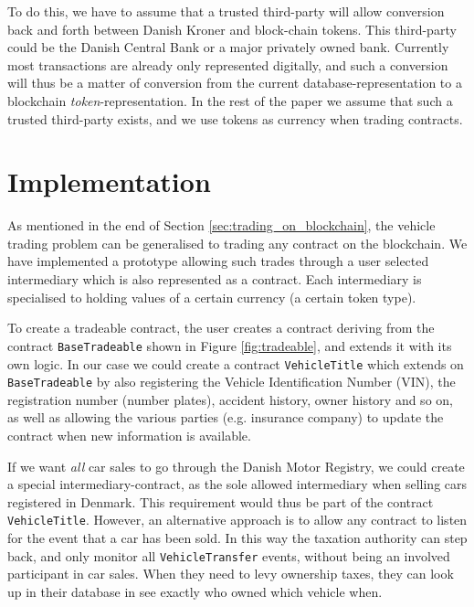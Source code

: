 \documentclass[oneside,a4paper,10pts,article]{memoir}
\begin{document}
To do this, we have to assume that a trusted third-party will allow
conversion back and forth between Danish Kroner and block-chain
tokens. This third-party could be the Danish Central Bank or a major
privately owned bank. Currently most transactions are already only
represented digitally, and such a conversion will thus be a matter of
conversion from the current database-representation to a blockchain
\emph{token}-representation. In the rest of the paper we assume that
such a trusted third-party exists, and we use tokens as currency when
trading contracts.

\chapter{Implementation}
\label{sec:implementation}
As mentioned in the end of Section \ref{sec:trading_on_blockchain},
the vehicle trading problem can be generalised to trading any contract
on the blockchain. We have implemented a prototype allowing such
trades through a user selected intermediary which is also represented
as a contract. Each intermediary is specialised to holding values of a
certain currency (a certain token type).

To create a tradeable contract, the user creates a contract deriving
from the contract \texttt{BaseTradeable} shown in Figure
\ref{fig:tradeable}, and extends it with its own logic. In our case we
could create a contract \texttt{VehicleTitle} which extends on
\texttt{BaseTradeable} by also registering the Vehicle Identification
Number (VIN), the registration number (number plates), accident
history, owner history and so on, as well as allowing the various
parties (e.g. insurance company) to update the contract when new
information is available.

If we want \emph{all} car sales to go through the Danish Motor
Registry, we could create a special intermediary-contract, as the sole
allowed intermediary when selling cars registered in Denmark. This
requirement would thus be part of the contract
\texttt{VehicleTitle}. However, an alternative approach is to allow
any contract to listen for the event that a car has been sold. In this
way the taxation authority can step back, and only monitor all
\texttt{VehicleTransfer} events, without being an involved participant
in car sales. When they need to levy ownership taxes, they can look up
in their database in see exactly who owned which vehicle when.
\end{document}
